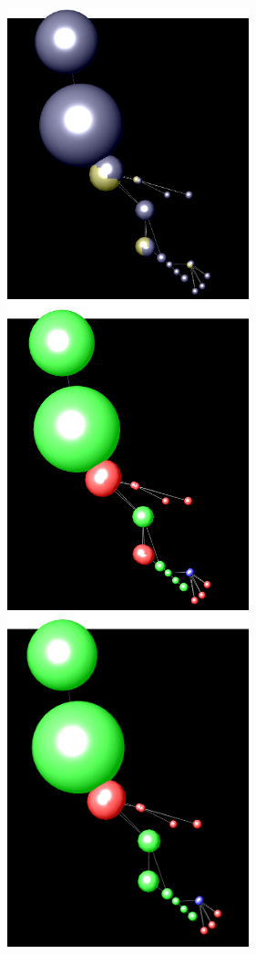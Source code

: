 \begin{figure}[!ht]
\begin{minipage}[t]{0.5\linewidth}
    \centering  
    \includegraphics[width=7cm]{images/a0}   
    \end{minipage}  
    \begin{minipage}[t]{0.5\linewidth} 
    \centering  
    \includegraphics[width=7cm]{images/a1}  
\end{minipage} 
\begin{minipage}[t]{0.5\linewidth}
    \centering  
    \includegraphics[width=7cm]{images/a2}    

\end{minipage}
\end{figure}

